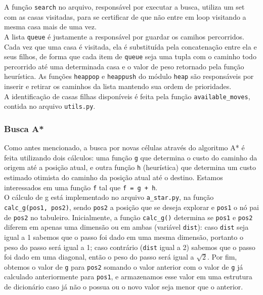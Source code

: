 \documentclass[12pt]{article}
\begin{document}
A função \verb|search| no arquivo, responsável por executar a busca, utiliza um set com as casas visitadas, para se certificar de que não entre em loop visitando a mesma casa mais de uma vez.\\

A lista \verb|queue| é justamente a responsável por guardar os camihos percorridos. Cada vez que uma casa é visitada, ela é substituída pela concatenação entre ela e seus filhos, de forma que cada item de \verb|queue| seja uma tupla com o caminho todo percorrido até uma determinada casa e o valor de peso retornado pela função heurística. As funções \verb|heappop| e \verb|heappush| do módulo \verb|heap| são responsáveis por inserir e retirar os caminhos da lista mantendo sua ordem de prioridades.\\

A identificação de casas filhas disponíveis é feita pela função \verb|available_moves|, contida no arquivo \verb|utils.py|.

\subsubsection{Busca A*}
Como antes mencionado, a busca por novas células através do algoritmo A* é feita utilizando dois cálculos: uma função \verb|g| que determina o custo do caminho da origem até a posição atual, e outra função \verb|h| (heurística) que determina um custo estimado otimista do caminho da posição atual até o destino. Estamos interessados em uma função \verb|f| tal que \verb|f = g + h|.\\

O cálculo de g está implementado no arquivo \verb|a_star.py|, na função \verb|calc_g(pos1, pos2)|, sendo \verb|pos2| a posição que se deseja explorar e \verb|pos1| o nó pai de \verb|pos2| no tabuleiro. Inicialmente, a função \verb|calc_g()| determina se \verb|pos1| e \verb|pos2| diferem em apenas uma dimensão ou em ambas (variável \verb|dist|): caso \verb|dist| seja igual a 1 sabemos que o passo foi dado em uma mesma dimensão, portanto o peso do passo será igual a 1; caso contrário (\verb|dist| igual a 2) sabemos que o passo foi dado em uma diagonal, então o peso do passo será igual a \(\sqrt{2}\). Por fim, obtemos o valor de \verb|g| para \verb|pos2| somando o valor anterior com o valor de \verb|g| já calculado anteriormente para \verb|pos1|, e armazenamos esse valor em uma estrutura de dicionário caso já não o possua ou o novo valor seja menor que o anterior.\\
\end{document}
